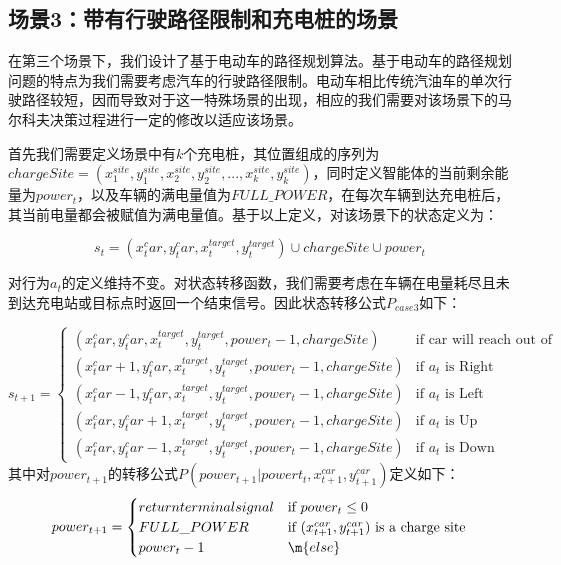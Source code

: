 \documentclass{standalone}
\begin{document}
\subsection{场景3：带有行驶路径限制和充电桩的场景}
在第三个场景下，我们设计了基于电动车的路径规划算法。基于电动车的路径规划问题的特点为我们需要考虑汽车的行驶路径限制。电动车相比传统汽油车的单次行驶路径较短，因而导致对于这一特殊场景的出现，相应的我们需要对该场景下的马尔科夫决策过程进行一定的修改以适应该场景。\par
首先我们需要定义场景中有$k$个充电桩，其位置组成的序列为$chargeSite = (x_1^{site}, y_1^{site}, x_2^{site}, y_2^{site}, ... , x_k^{site}, y_k^{site})$，同时定义智能体的当前剩余能量为$power_t$，以及车辆的满电量值为$FULL\_POWER$，在每次车辆到达充电桩后，其当前电量都会被赋值为满电量值。基于以上定义，对该场景下的状态定义为：
\begin{center}
    \begin{equation}
        s_t = (x_t^car, y_t^car, x^{target}_t, y^{target}_t) \cup chargeSite \cup power_t
    \end{equation}
\end{center}
对行为$a_t$的定义维持不变。对状态转移函数，我们需要考虑在车辆在电量耗尽且未到达充电站或目标点时返回一个结束信号。因此状态转移公式$P_{case3}$如下：
\begin{center}
    \begin{equation}
    s_{t+1} = \begin{cases}
    (x_t^car, y_t^car, x^{target}_t, y^{target}_t, power_t-1, chargeSite) &\mbox{if car will reach out of map}\\
    (x_t^car + 1, y_t^car, x^{target}_t, y^{target}_t, power_t-1, chargeSite) &\mbox{if $a_t$ is Right}\\
    (x_t^car - 1, y_t^car, x^{target}_t, y^{target}_t, power_t-1, chargeSite) &\mbox{if $a_t$ is Left}\\
    (x_t^car, y_t^car + 1, x^{target}_t, y^{target}_t, power_t-1, chargeSite) &\mbox{if $a_t$ is Up}\\
    (x_t^car, y_t^car - 1, x^{target}_t, y^{target}_t, power_t-1, chargeSite) &\mbox{if $a_t$ is Down}
    \end{cases}
    \end{equation}
    \mbox{其中对$power_{t+1}$的转移公式$P(power_{t+1}| powert_{t}, x_{t+1}^{car}, y_{t+1}^{car})$定义如下：}
    \begin{equation}
        power_{t+1} = \begin{cases}
        return terminal signal &\mbox{if $power_t \leq 0$}\\
        FULL\_POWER &\mbox{if $(x_{t+1}^{car}, y_{t+1}^{car})$ is a charge site}\\
        power_{t} - 1 &\m{else}
        \end{cases}
    \end{equation}
\end{center}
\end{document}
